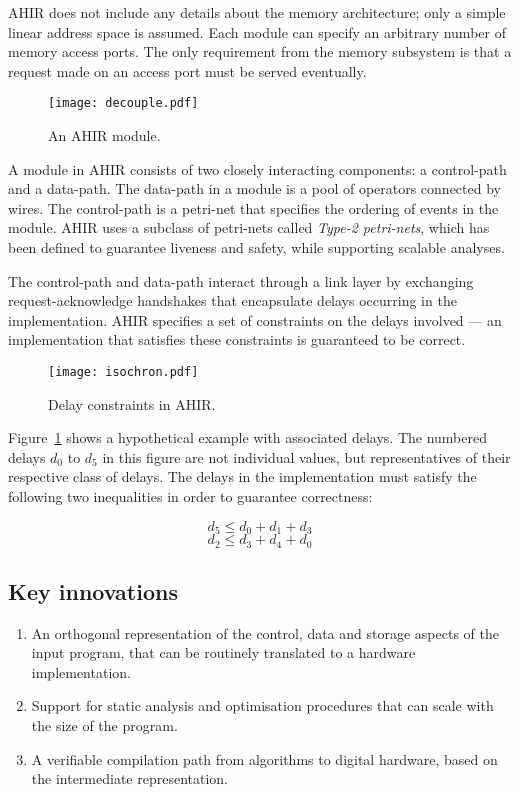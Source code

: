 \documentclass[12pt]{article}
\begin{document}
AHIR does not include any details about the memory architecture; only
a simple linear address space is assumed. Each module can specify an
arbitrary number of memory access ports. The only requirement from the
memory subsystem is that a request made on an access port must be
served eventually.

\begin{figure}[h]
\centering
\texttt{[image: decouple.pdf]}
\caption{An AHIR module.}
\end{figure}

A module in AHIR consists of two closely interacting components: a
control-path and a data-path. The data-path in a module is a pool of
operators connected by wires. The control-path is a petri-net that
specifies the ordering of events in the module. AHIR uses a subclass
of petri-nets called {\em Type-2 petri-nets}, which has been defined
to guarantee liveness and safety, while supporting scalable analyses.


The control-path and data-path interact through a link layer by
exchanging request-acknowledge handshakes that encapsulate delays
occurring in the implementation. AHIR specifies a set of constraints
on the delays involved --- an implementation that satisfies these
constraints is guaranteed to be correct.

\begin{figure}[h]
\centering
\texttt{[image: isochron.pdf]}
\caption{Delay constraints in AHIR.}
\label{fig:isochron}
\end{figure}

Figure~\ref{fig:isochron} shows a hypothetical example with associated
delays. The numbered delays $d_0$ to $d_5$ in this figure are not
individual values, but representatives of their respective class of
delays. The delays in the implementation must satisfy the following
two inequalities in order to guarantee correctness:

\[d_5 \le d_0 + d_1 + d_3\]
\[d_2 \le d_3 + d_4 + d_0\]

\subsection{Key innovations}

\begin{enumerate}
\item An orthogonal representation of the control, data and storage
      aspects of the input program, that can be routinely translated
      to a hardware implementation.
\item Support for static analysis and optimisation procedures that can
      scale with the size of the program.
\item A verifiable compilation path from algorithms to digital
      hardware, based on the intermediate representation.
\end{enumerate}
\end{document}
